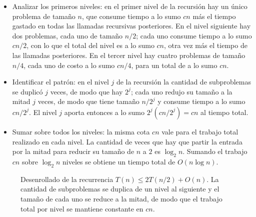 \documentclass[12pt, spanish, oneside, openany]{book}
\theoremstyle{uprightplain}
\theoremstyle{definition}
\theoremstyle{remark}
\theoremstyle{definition}
\begin{document}
\begin{itemize}
    \item Analizar los primeros niveles: en el primer nivel de la recursión hay un único problema de tamaño $n$, que consume tiempo a lo sumo $cn$ más el tiempo gastado en todas las llamadas recursivas posteriores. En el nivel siguiente hay dos problemas, cada uno de tamaño $n/2$; cada uno consume tiempo a lo sumo $cn/2$, con lo que el total del nivel es a lo sumo $cn$, otra vez más el tiempo de las llamadas posteriores. En el tercer nivel hay cuatro problemas de tamaño $n/4$, cada uno de costo a lo sumo $cn/4$, para un total de a lo sumo $cn$.

    \item Identificar el patrón: en el nivel $j$ de la recursión la cantidad de subproblemas se duplicó $j$ veces, de modo que hay $2^j$; cada uno redujo su tamaño a la mitad $j$ veces, de modo que tiene tamaño $n/2^j$ y consume tiempo a lo sumo $cn/2^j$. El nivel $j$ aporta entonces a lo sumo $2^j(cn/2^j)=cn$ al tiempo total.

    \item Sumar sobre todos los niveles: la misma cota $cn$ vale para el trabajo total realizado en cada nivel. La cantidad de veces que hay que partir la entrada por la mitad para reducir su tamaño de $n$ a $2$ es $\log_2 n$. Sumando el trabajo $cn$ sobre $\log_2 n$ niveles se obtiene un tiempo total de $O(n\log n)$.
\end{itemize}

\begin{figure}[H]
\centering
{}
\caption{Desenrollado de la recurrencia $T(n)\le 2T(n/2)+O(n)$. La cantidad de
subproblemas se duplica de un nivel al siguiente y el tamaño de cada uno se
reduce a la mitad, de modo que el trabajo total por nivel se mantiene constante
en $cn$.}
\label{fig:desenrollo-q2}
\end{figure}
\end{document}
